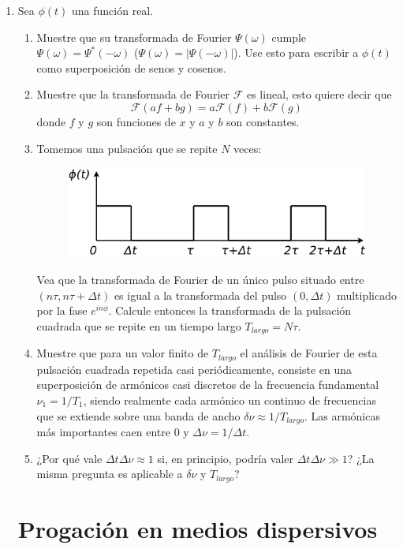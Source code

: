 \documentclass[11pt,spanish,a4paper]{article}
\begin{document}
\begin{enumerate}
\item Sea $\phi(t)$ una función real.
\begin{enumerate}
	\item Muestre que su transformada de Fourier $\Psi(\omega)$ cumple $\Psi(\omega) = \Psi^*(-\omega)$ ($\Psi(\omega) = |\Psi(-\omega)|$).
Use esto para escribir a $\phi(t)$ como superposición de senos y
cosenos.
	\item Muestre que la transformada de Fourier $\mathcal{F}$ es lineal, esto
quiere decir que
\[
\mathcal{F}(af+bg)=a\mathcal{F}(f)+b\mathcal{F}(g)
\]
donde $f$ y $g$ son funciones de $x$ y $a$ y $b$ son constantes.
	\item Tomemos una pulsación que se repite $N$ veces:
\begin{figure}[H]
\centering{}\includegraphics[clip,scale=0.25]{ej2-18}
\end{figure}
Vea que la transformada de Fourier de un único pulso situado entre
$(n\tau,n\tau+\Delta t)$ es igual a la transformada del pulso $(0,\Delta t)$
multiplicado por la fase $e^{in\phi}$. Calcule entonces la transformada
de la pulsación cuadrada que se repite en un tiempo largo $T_{largo}=N\tau$.
	\item Muestre que para un valor finito de $T_{largo}$ el análisis de Fourier
de esta pulsación cuadrada repetida casi periódicamente, consiste
en una superposición de armónicos casi discretos de la frecuencia
fundamental $\nu_{1}=1/T_{1}$, siendo realmente cada armónico un
continuo de frecuencias que se extiende sobre una banda de ancho $\delta\nu\approx1/T_{largo}$.
Las armónicas más importantes caen entre 0 y $\Delta\nu=1/\Delta t$.
	\item ¿Por qué vale $\Delta t\Delta\nu\approx1$ si, en principio, podría
valer $\Delta t\Delta\nu\gg1$? ¿La misma pregunta es aplicable a
$\delta\nu$ y $T_{largo}$?
\end{enumerate}


\section*{Progación en medios dispersivos}


\end{enumerate}
\end{document}

